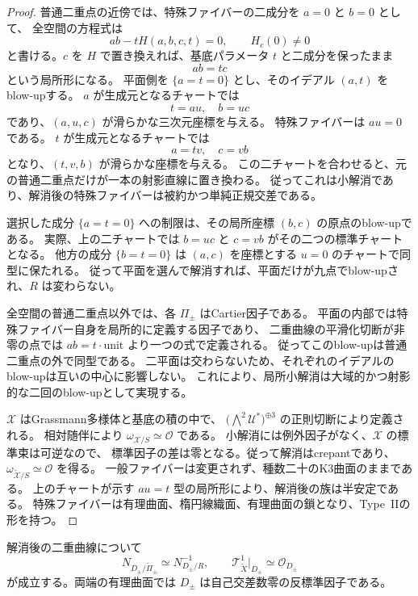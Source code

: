 \begin{proof}
普通二重点の近傍では、特殊ファイバーの二成分を $a=0$ と $b=0$ として、
全空間の方程式は
\[
 ab-tH(a,b,c,t)=0,\qquad H_c(0)\ne0
\]
と書ける。$c$ を $H$ で置き換えれば、基底パラメータ $t$ と二成分を保ったまま
\begin{equation}\label{eq:node-small-resolution-v28}
 ab=tc
\end{equation}
という局所形になる。
平面側を $\{a=t=0\}$ とし、そのイデアル $(a,t)$ をblow-upする。
$a$ が生成元となるチャートでは
\[
 t=au,\quad b=uc
\]
であり、$(a,u,c)$ が滑らかな三次元座標を与える。
特殊ファイバーは $au=0$ である。
$t$ が生成元となるチャートでは
\[
 a=tv,\quad c=vb
\]
となり、$(t,v,b)$ が滑らかな座標を与える。
この二チャートを合わせると、元の普通二重点だけが一本の射影直線に置き換わる。
従ってこれは小解消であり、解消後の特殊ファイバーは被約かつ単純正規交差である。

選択した成分 $\{a=t=0\}$ への制限は、その局所座標 $(b,c)$ の原点のblow-upである。
実際、上の二チャートでは $b=uc$ と $c=vb$ がその二つの標準チャートとなる。
他方の成分 $\{b=t=0\}$ は $(a,c)$ を座標とする $u=0$ のチャートで同型に保たれる。
従って平面を選んで解消すれば、平面だけが九点でblow-upされ、$R$ は変わらない。

全空間の普通二重点以外では、各 $\Pi_\pm$ はCartier因子である。
平面の内部では特殊ファイバー自身を局所的に定義する因子であり、
二重曲線の平滑化切断が非零の点では $ab=t\cdot\text{unit}$ より一つの式で定義される。
従ってこのblow-upは普通二重点の外で同型である。
二平面は交わらないため、それぞれのイデアルのblow-upは互いの中心に影響しない。
これにより、局所小解消は大域的かつ射影的な二回のblow-upとして実現する。

$\mathscr X$ はGrassmann多様体と基底の積の中で、
$\bigl(\bigwedge^2\mathcal U^*\bigr)^{\oplus3}$ の正則切断により定義される。
相対随伴により $\omega_{\mathscr X/S}\simeq\mathcal O$ である。
小解消には例外因子がなく、$\mathscr X$ の標準束は可逆なので、
標準因子の差は零となる。従って解消はcrepantであり、
$\omega_{\widetilde{\mathscr X}/S}\simeq\mathcal O$ を得る。
一般ファイバーは変更されず、種数二十のK3曲面のままである。
上のチャートが示す $au=t$ 型の局所形により、解消後の族は半安定である。
特殊ファイバーは有理曲面、楕円線織面、有理曲面の鎖となり、Type~IIの形を持つ。
\end{proof}

\begin{corollary}[二重曲線の法束の相殺]
\label{cor:normal-cancellation-v28}
解消後の二重曲線について
\[
 N_{D_\pm/\widetilde\Pi_\pm}
 \simeq N_{D_\pm/R}^{-1},\qquad
 \mathcal T^1_{\widetilde X}|_{D_\pm}\simeq\mathcal O_{D_\pm}
\]
が成立する。両端の有理曲面では $D_\pm$ は自己交差数零の反標準因子である。
\end{corollary}

